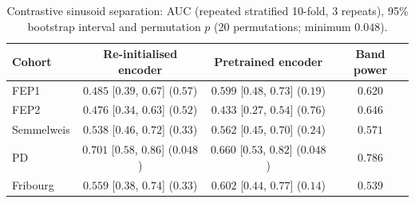 \documentclass[10pt]{article}
\begin{document}
\begin{table}[h]
    \centering
    \caption{Contrastive sinusoid separation: AUC (repeated stratified 10-fold, 3 repeats), 95\% bootstrap interval and permutation $p$ (20 permutations; minimum $0.048$).}
    \label{tab:s_contrastive}
    \footnotesize\setlength{\tabcolsep}{4pt}
    \begin{tabular}{@{}l c c c@{}}
        \hline
        \hline
        \hfil Cohort & \hfil Re-initialised encoder & \hfil Pretrained encoder & \hfil Band power \\
        \hline
        FEP1 & $0.485$ [$0.39$, $0.67$] ($0.57$) & $0.599$ [$0.48$, $0.73$] ($0.19$) & $0.620$ \\
        FEP2 & $0.476$ [$0.34$, $0.63$] ($0.52$) & $0.433$ [$0.27$, $0.54$] ($0.76$) & $0.646$ \\
        Semmelweis & $0.538$ [$0.46$, $0.72$] ($0.33$) & $0.562$ [$0.45$, $0.70$] ($0.24$) & $0.571$ \\
        PD & $0.701$ [$0.58$, $0.86$] ($0.048$) & $0.660$ [$0.53$, $0.82$] ($0.048$) & $0.786$ \\
        Fribourg & $0.559$ [$0.38$, $0.74$] ($0.33$) & $0.602$ [$0.44$, $0.77$] ($0.14$) & $0.539$ \\
        \hline
        \hline
    \end{tabular}
\end{table}
\end{document}
